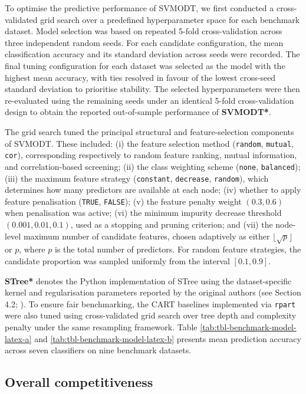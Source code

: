 To optimise the predictive performance of SVMODT, we first conducted a cross-validated grid search over a predefined hyperparameter space for each benchmark dataset. Model selection was based on repeated 5-fold cross-validation across three independent random seeds. For each candidate configuration, the mean classification accuracy and its standard deviation across seeds were recorded. The final tuning configuration for each dataset was selected as the model with the highest mean accuracy, with ties resolved in favour of the lowest cross-seed standard deviation to prioritise stability. The selected hyperparameters were then re-evaluated using the remaining seeds under an identical 5-fold cross-validation design to obtain the reported out-of-sample performance of \textbf{SVMODT*}.

The grid search tuned the principal structural and feature-selection components of SVMODT. These included: (i) the feature selection method (\texttt{random}, \texttt{mutual}, \texttt{cor}), corresponding respectively to random feature ranking, mutual information, and correlation-based screening; (ii) the class weighting scheme (\texttt{none}, \texttt{balanced}); (iii) the maximum feature strategy (\texttt{constant}, \texttt{decrease}, \texttt{random}), which determines how many predictors are available at each node; (iv) whether to apply feature penalisation (\texttt{TRUE}, \texttt{FALSE}); (v) the feature penalty weight \((0.3, 0.6)\) when penalisation was active; (vi) the minimum impurity decrease threshold \((0.001, 0.01, 0.1)\), used as a stopping and pruning criterion; and (vii) the node-level maximum number of candidate features, chosen adaptively as either \(\lfloor \sqrt{p} \rfloor\) or \(p\), where \(p\) is the total number of predictors. For random feature strategies, the candidate proportion was sampled uniformly from the interval \([0.1, 0.9]\).

\textbf{STree*} denotes the Python implementation of STree using the dataset-specific kernel and regularisation parameters reported by the original authors (see Section 4.2; \citet{montanana2025}). To ensure fair benchmarking, the CART baselines implemented via \texttt{rpart} were also tuned using cross-validated grid search over tree depth and complexity penalty under the same resampling framework. Table \ref{tab:tbl-benchmark-model-latex-a} and \ref{tab:tbl-benchmark-model-latex-b} presents mean prediction accuracy across seven classifiers on nine benchmark datasets.

\subsection{Overall competitiveness}\label{overall-competitiveness}

